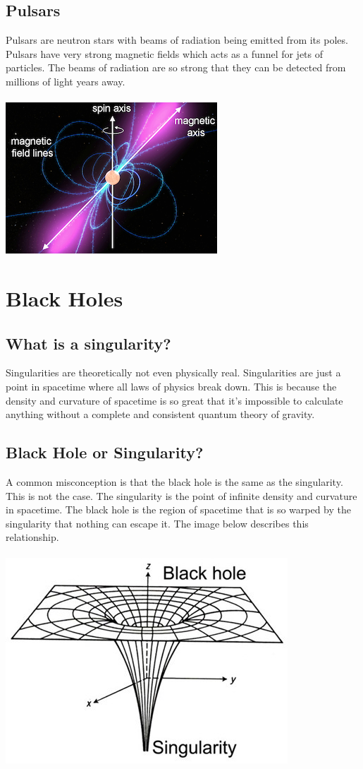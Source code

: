 \documentclass{article}
\begin{document}
\subsection{Pulsars}
Pulsars are neutron stars with beams of radiation being emitted from its poles. Pulsars have very strong magnetic fields which acts as a funnel for jets of particles. The beams of radiation are so strong that they can be detected from millions of light years away.\\\\
\includegraphics[scale=0.6]{images/pulsars.png}

\section{Black Holes}
\subsection{What is a singularity?}
Singularities are theoretically not even physically real. Singularities are just a point in spacetime where all laws of physics break down. This is because the density and curvature of spacetime is so great that it's impossible to calculate anything without a complete and consistent quantum theory of gravity.

\subsection{Black Hole or Singularity?}
A common misconception is that the black hole is the same as the singularity. This is not the case. The singularity is the point of infinite density and curvature in spacetime. The black hole is the region of spacetime that is so warped by the singularity that nothing can escape it. The image below describes this relationship.\\\\
\includegraphics[scale=0.5]{images/black_hole.png}
\end{document}
